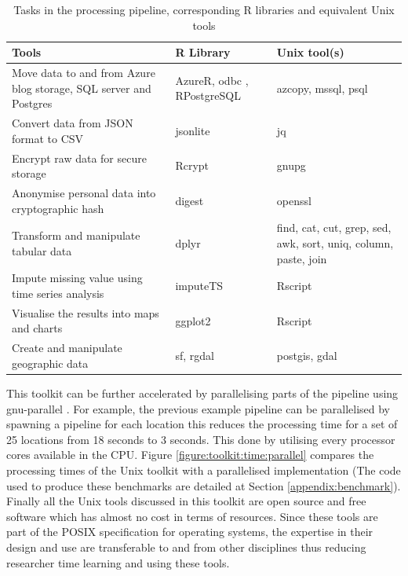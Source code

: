\begin{table}[h]
  \footnotesize
  \begin{center}
    \begin{tabular}{p{4cm}p{3cm}p{3cm}}
      \toprule
      Tools & R Library & Unix tool(s)\\
      \midrule
        Move data to and from Azure blog storage, SQL server and Postgres & AzureR, odbc , RPostgreSQL & azcopy, mssql, psql\\
				Convert data from JSON format to CSV & jsonlite & jq\\
        \addlinespace[0.2cm]
				Encrypt raw data for secure storage & Rcrypt & gnupg\\
        \addlinespace[0.2cm]
				Anonymise personal data into cryptographic hash & digest & openssl\\
        \addlinespace[0.2cm]
				Transform and manipulate tabular data& dplyr & find, cat, cut, grep, sed, awk, sort, uniq, column, paste, join\\
        \addlinespace[0.2cm]
				Impute missing value using time series analysis & imputeTS & Rscript\\
        \addlinespace[0.2cm]
				Visualise the results into maps and charts & ggplot2 & Rscript\\
        \addlinespace[0.2cm]
        Create and manipulate geographic data & sf, rgdal & postgis, gdal\\
      \bottomrule
    \end{tabular}
  \end{center}
  \caption{Tasks in the processing pipeline, corresponding R libraries and equivalent Unix tools}
  \label{table:toolkit:tools}
\end{table}

This toolkit can be further accelerated by parallelising parts of the pipeline using gnu-parallel \cite[-7cm]{tange2018parallel}.
For example, the previous example pipeline can be parallelised by spawning a pipeline for each location this reduces the processing time for a set of 25 locations from 18 seconds to 3 seconds.
This done by utilising every processor cores available in the CPU.
Figure \ref{figure:toolkit:time:parallel} compares the processing times of the Unix toolkit with a parallelised implementation (The code used to produce these benchmarks are detailed at Section \ref{appendix:benchmark}).
Finally all the Unix tools discussed in this toolkit are open source and free software which has almost no cost in terms of resources.
Since these tools are part of the POSIX specification \cite[-7.5cm]{walli1995posix} for operating systems, the expertise in their design and use are transferable to and from other disciplines thus reducing researcher time learning and using these tools.

